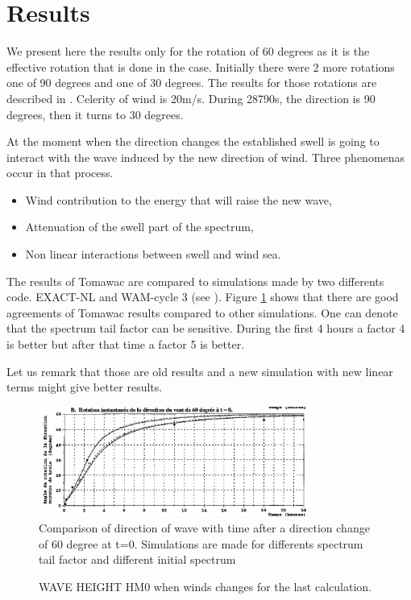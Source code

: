 \section{Results}
%
We present here the results only for the rotation of 60 degrees as it is the effective rotation that is done in the case. Initially there were 2 more rotations one of 90 degrees and one of 30 degrees. The results for those rotations are described in \cite{Benoit1996_2}.
Celerity of wind is 20m/s. During 28790s, the direction is 90 degrees, then it turns to 30 degrees.  

At the moment when the direction changes the established swell is going to interact with the wave induced by the new direction of wind. Three phenomenas occur in that process.
\begin {itemize}
\item Wind contribution to the energy that will raise the new wave,
\item Attenuation of the swell part of the spectrum,
\item Non linear interactions between swell and wind sea.
\end{itemize}

The results of Tomawac are compared to simulations made by two differents code. EXACT-NL and WAM-cycle 3 (see \cite{Vanvledder1990}). Figure  \ref{resturnwind} shows that there are good agreements of Tomawac results compared to other simulations. One can denote that the spectrum tail factor can be sensitive. During the first 4 hours a factor 4 is better but after that time a factor 5 is better.

Let us remark that those are old results and a new simulation with new linear terms might give better results.

\begin{figure} [!h]
\centering
\includegraphics[width=0.8\textwidth]{resuTW60.png}
 \caption{Comparison of direction of wave with time after a direction change of 60 degree at t=0. Simulations are made for differents spectrum tail factor and different initial spectrum}
\label{resturnwind}
\end{figure}

\begin{figure} [!h]
\centering
{}
 \caption{WAVE HEIGHT HM0 when winds changes for the last calculation.}
\label{resturningwind}
\end{figure}
